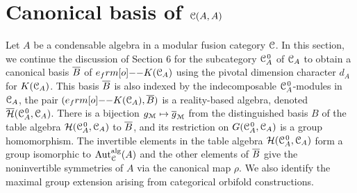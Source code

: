 \documentclass{amsart}
\begin{document}
\section{Canonical basis of \texorpdfstring{$\CC(A,A)$}{}}
Let $A$ be a condensable algebra in a modular fusion category $\CC$. In this section, we continue the discussion of Section 6 for the subcategory $\CAo$  of $\CA$ to obtain a canonical basis $\ol{B}$ of $e_\1 \KA$  using the pivotal dimension character $d_A$ for $\KA$. This basis $\ol B$ is also indexed by the indecomposable $\CAo$-modules in $\CA$, the pair $(e_\1 \KA, \ol B)$ is a reality-based algebra, denoted $\oHA$. There is a bijection $\gm \mapsto \ogm$ from the distinguished basis $B$ of the table algebra $\HA$ to $\ol B$, and its restriction on $\GA$ is a group homomorphism.  The invertible elements in the table algebra $\HA$ form a group isomorphic to $\Auta(A)$ and the other elements of $\ol B$ give the noninvertible symmetries of $A$ via the canonical map $\rho$. 
We also identify the maximal group extension arising from categorical orbifold constructions.
\end{document}

